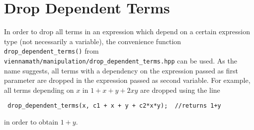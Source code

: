

 \section{Drop Dependent Terms}
In order to drop all terms in an expression which depend on a certain expression type (not necessarily a variable), the convenience function
\lstinline|drop_dependent_terms()| from \lstinline|viennamath/manipulation/drop_dependent_terms.hpp| can be used. As the name suggests, all terms with a
dependency on the expression passed as first parameter are dropped in the expression passed as second variable.
For example, all terms depending on $x$ in $1+x+y+2xy$ are dropped using the line
\begin{lstlisting}
 drop_dependent_terms(x, c1 + x + y + c2*x*y);  //returns 1+y
\end{lstlisting}
in order to obtain $1+y$.





